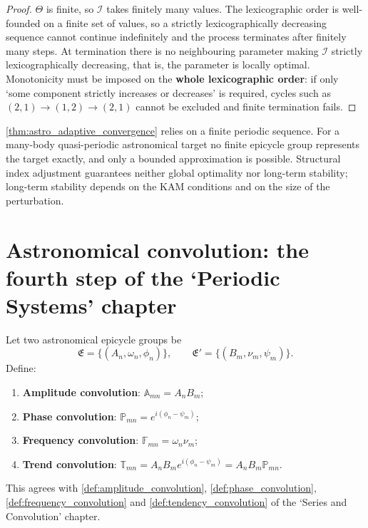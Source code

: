 \begin{proof}
$\Theta$ is finite, so $\mathcal I$ takes finitely many values. The lexicographic order is well-founded on a finite set of values, so a strictly lexicographically decreasing sequence cannot continue indefinitely and the process terminates after finitely many steps. At termination there is no neighbouring parameter making $\mathcal I$ strictly lexicographically decreasing, that is, the parameter is locally optimal. Monotonicity must be imposed on the \textbf{whole lexicographic order}: if only `some component strictly increases or decreases' is required, cycles such as $(2,1)\to(1,2)\to(2,1)$ cannot be excluded and finite termination fails.
\end{proof}

\begin{remark}\label{rem:astro_adaptive_boundary}
\cref{thm:astro_adaptive_convergence} relies on a finite periodic sequence. For a many-body quasi-periodic astronomical target no finite epicycle group represents the target exactly, and only a bounded approximation is possible. Structural index adjustment guarantees neither global optimality nor long-term stability; long-term stability depends on the KAM conditions and on the size of the perturbation.
\end{remark}

\section{Astronomical convolution: the fourth step of the `Periodic Systems' chapter}
\label{sec:astro_convolution}

\begin{definition}\label{def:astro_convolution_types}
Let two astronomical epicycle groups be
\[
\mathfrak E=\{(A_n,\omega_n,\phi_n)\},\qquad
\mathfrak E'=\{(B_m,\nu_m,\psi_m)\}.
\]
Define:
\begin{enumerate}[label=(\roman*)]
    \item \textbf{Amplitude convolution}: \(\mathbb A_{mn}=A_nB_m\);
    \item \textbf{Phase convolution}: \(\mathbb P_{mn}=e^{i(\phi_n-\psi_m)}\);
    \item \textbf{Frequency convolution}: \(\mathbb F_{mn}=\omega_n\nu_m\);
    \item \textbf{Trend convolution}: \(\mathbb T_{mn}=A_nB_m e^{i(\phi_n-\psi_m)}=A_nB_m\mathbb P_{mn}\).
\end{enumerate}
This agrees with \cref{def:amplitude_convolution}, \cref{def:phase_convolution}, \cref{def:frequency_convolution} and \cref{def:tendency_convolution} of the `Series and Convolution' chapter.
\end{definition}

